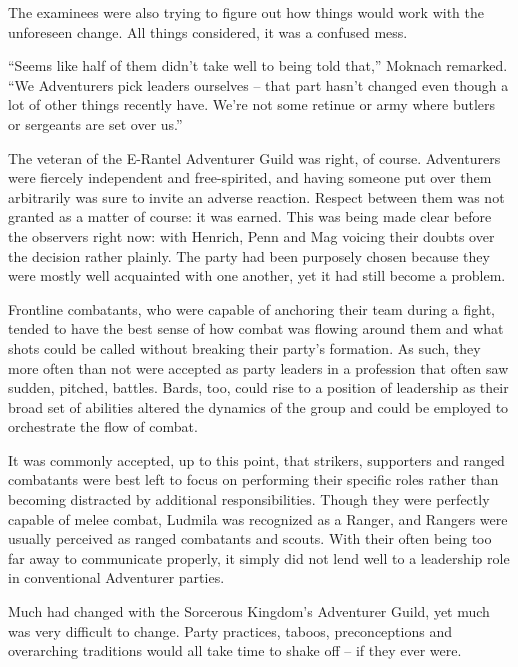  

The examinees were also trying to figure out how things would work with the unforeseen change. All things considered, it was a confused mess.

 

“Seems like half of them didn’t take well to being told that,” Moknach remarked. “We Adventurers pick leaders ourselves – that part hasn’t changed even though a lot of other things recently have. We’re not some retinue or army where butlers or sergeants are set over us.”

 

The veteran of the E-Rantel Adventurer Guild was right, of course. Adventurers were fiercely independent and free-spirited, and having someone put over them arbitrarily was sure to invite an adverse reaction. Respect between them was not granted as a matter of course: it was earned. This was being made clear before the observers right now: with Henrich, Penn and Mag voicing their doubts over the decision rather plainly. The party had been purposely chosen because they were mostly well acquainted with one another, yet it had still become a problem.

 

Frontline combatants, who were capable of anchoring their team during a fight, tended to have the best sense of how combat was flowing around them and what shots could be called without breaking their party’s formation. As such, they more often than not were accepted as party leaders in a profession that often saw sudden, pitched, battles. Bards, too, could rise to a position of leadership as their broad set of abilities altered the dynamics of the group and could be employed to orchestrate the flow of combat.

 

It was commonly accepted, up to this point, that strikers, supporters and ranged combatants were best left to focus on performing their specific roles rather than becoming distracted by additional responsibilities. Though they were perfectly capable of melee combat, Ludmila was recognized as a Ranger, and Rangers were usually perceived as ranged combatants and scouts. With their often being too far away to communicate properly, it simply did not lend well to a leadership role in conventional Adventurer parties.

 

Much had changed with the Sorcerous Kingdom’s Adventurer Guild, yet much was very difficult to change. Party practices, taboos, preconceptions and overarching traditions would all take time to shake off – if they ever were.

